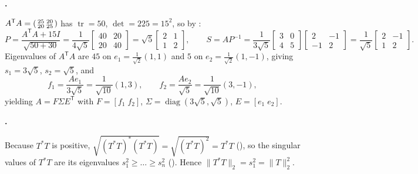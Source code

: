 \documentclass[10pt]{scrartcl}
\DeclareMathOperator{\tr}{tr}\DeclareMathOperator{\nul}{null}\DeclareMathOperator{\range}{range}\DeclareMathOperator{\spn}{span}
\begin{document}
\begin{prob}
  \textbf{. }\par
  \begin{steps}
    \ii $A^{\mathsf T}A=\begin{psmallmatrix}25&20\\20&25\end{psmallmatrix}$ has $\tr=50$, $\det=225=15^2$, so by :
    \[
      P = \frac{A^{\mathsf T}A+15I}{\sqrt{50+30}} = \frac{1}{4\sqrt{5}}\begin{bmatrix}40&20\\20&40\end{bmatrix} = \sqrt{5}\begin{bmatrix}2&1\\1&2\end{bmatrix}, \qquad
      S = AP^{-1} = \frac{1}{3\sqrt{5}}\begin{bmatrix}3&0\\4&5\end{bmatrix}\begin{bmatrix}2&-1\\-1&2\end{bmatrix} = \frac{1}{\sqrt{5}}\begin{bmatrix}2&-1\\1&2\end{bmatrix}.
    \]
    \ii Eigenvalues of $A^{\mathsf T}A$ are $45$ on $e_1=\frac{1}{\sqrt{2}}(1,1)$ and $5$ on $e_2=\frac{1}{\sqrt{2}}(1,-1)$, giving $s_1=3\sqrt{5}$, $s_2=\sqrt{5}$, and
    \[
      f_1 = \frac{Ae_1}{3\sqrt{5}} = \frac{1}{\sqrt{10}}(1,3),\qquad
      f_2 = \frac{Ae_2}{\sqrt{5}} = \frac{1}{\sqrt{10}}(3,-1),
    \]
    yielding $A=F\Sigma E^{\mathsf T}$ with $F=[f_1\;f_2]$, $\Sigma=\operatorname{diag}(3\sqrt{5},\sqrt{5})$, $E=[e_1\;e_2]$.
  \end{steps}
\end{prob}

\begin{prob}
  \textbf{. }\par
  Because $T^*T$ is positive, $\sqrt{(T^*T)^*(T^*T)}=\sqrt{(T^*T)^2}=T^*T$ (), so the singular values of $T^*T$ are its eigenvalues $s_1^2\ge\dots\ge s_n^2$ (). Hence $\|T^*T\|_2 = s_1^2 = \|T\|_2^2$.
\end{prob}
\end{document}

